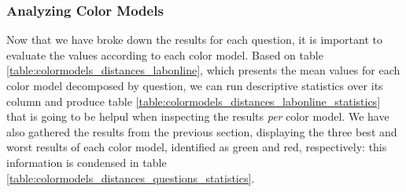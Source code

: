 \subsubsection{Analyzing Color Models}
\label{subsubsec:models_analyzing}
%
Now that we have broke down the results for each question, it is important to evaluate the values according to each color model. Based on table \ref{table:colormodels_distances_labonline},
which presents the mean values for each color model decomposed by question, we can run descriptive statistics over its column and produce table \ref{table:colormodels_distances_labonline_statistics} that
is going to be helpul when inspecting the results \emph{per} color model. We have also gathered the results from the previous section, displaying the three best and worst results of each color model, identified as green and red,
respectively: this information is condensed in table \ref{table:colormodels_distances_questions_statistics}. \par
%
